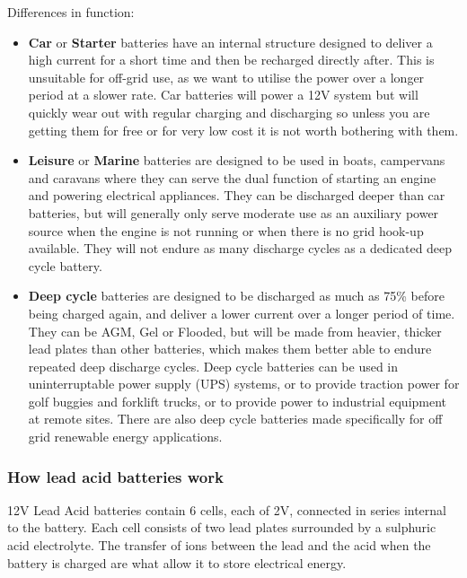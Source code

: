 \documentclass{article}
\theoremstyle{definition}
\theoremstyle{definition}
\theoremstyle{remark}
\begin{document}
      Differences in function:

      \begin{itemize}[label={}]
        \item \textbf{Car} or \textbf{Starter} batteries have an internal structure designed to deliver a high current for a short time and then be recharged directly after. This is unsuitable for off-grid use, as we want to utilise the power over a longer period at a slower rate. Car batteries will power a 12V system but will quickly wear out with regular charging and discharging so unless you are getting them for free or for very low cost it is not worth bothering with them.

        \item \textbf{Leisure} or \textbf{Marine} batteries are designed to be used in boats, campervans and caravans where they can serve the dual function of starting an engine and powering electrical appliances. They can be discharged deeper than car batteries, but will generally only serve moderate use as an auxiliary power source when the engine is not running or when there is no grid hook-up available. They will not endure as many discharge cycles as a dedicated deep cycle battery.

        \item \textbf{Deep cycle} batteries are designed to be discharged as much as 75\% before being charged again, and deliver a lower current over a longer period of time. They can be AGM, Gel or Flooded, but will be made from heavier, thicker lead plates than other batteries, which makes them better able to endure repeated deep discharge cycles. Deep cycle batteries can be used in uninterruptable power supply (UPS) systems, or to provide traction power for golf buggies and forklift trucks, or to provide power to industrial equipment at remote sites. There are also deep cycle batteries made specifically for off grid renewable energy applications. 
      \end{itemize}
    

    \subsubsection{How lead acid batteries work} %
    \label{ssub:how_lead_acid_batteries_work}

      12V Lead Acid batteries contain 6 cells, each of 2V, connected in series internal to the battery. Each cell consists of two lead plates surrounded by a sulphuric acid electrolyte. The transfer of ions between the lead and the acid when the battery is charged are what allow it to store electrical energy.
\end{document}
